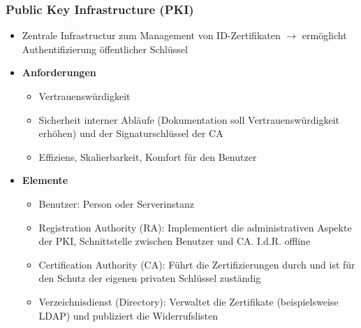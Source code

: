 \subsubsection{Public Key Infrastructure (PKI)}
\begin{itemize}
	\item Zentrale Infrastructur zum Management von ID-Zertifikaten \(\rightarrow\) ermöglicht Authentifizierung öffentlicher Schlüssel
	\item \textbf{Anforderungen}
	\begin{itemize}
		\item Vertrauenswürdigkeit
		\item Sicherheit interner Abläufe (Dokumentation soll Vertrauenswürdigkeit erhöhen) und der Signaturschlüssel der CA
		\item Effiziens, Skalierbarkeit, Komfort für den Benutzer
	\end{itemize}
	\item \textbf{Elemente}
	\begin{itemize}
		\item Benutzer: Person oder Serverinstanz
		\item Registration Authority (RA): Implementiert die administrativen Aspekte der PKI, Schnittstelle zwischen Benutzer und CA. I.d.R. offline
		\item Certification Authority (CA): Führt die Zertifizierungen durch und ist für den Schutz der eigenen privaten Schlüssel zuständig
		\item Verzeichnisdienst (Directory): Verwaltet die Zertifikate (beispielsweise LDAP) und publiziert die Widerrufslisten
	\end{itemize}
\end{itemize}


